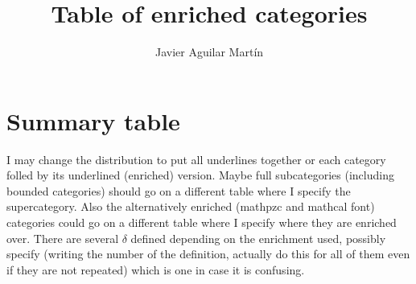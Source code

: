 \documentclass[twoside]{article}
\begin{document}
\title{Table of enriched categories}
\author{Javier Aguilar Martín}
\maketitle

\section{Summary table}
I may change the distribution to put all underlines together or each category folled by its underlined (enriched) version. Maybe full subcategories (including bounded categories) should go on a different table where I specify the supercategory. Also the alternatively enriched (mathpzc and mathcal font) categories could go on a different table where I specify where they are enriched over. There are several $\delta$ defined depending  on the enrichment used, possibly specify (writing the number of the definition, actually do this for all of them even if they are not repeated) which is one in case it is confusing.
\end{document}
